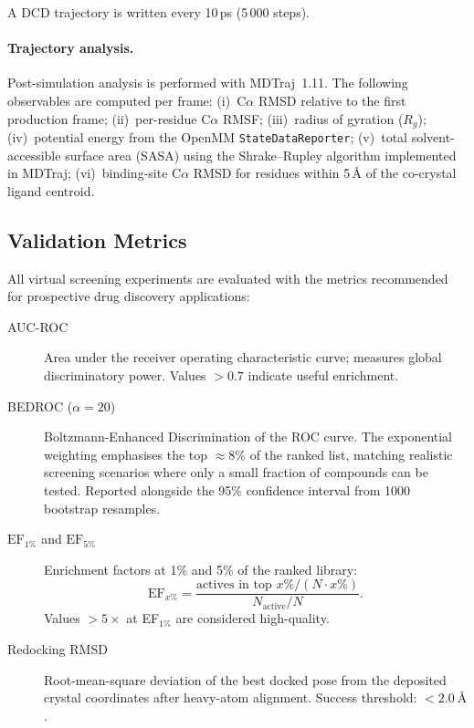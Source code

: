 \documentclass[journal=jcisd8,manuscript=article]{achemso}
\begin{document}
A DCD trajectory is written every 10\,ps (5\,000 steps).

\paragraph{Trajectory analysis.}
Post-simulation analysis is performed with MDTraj~1.11.\cite{eastman2017openmm}
The following observables are computed per frame: (i)~C$\alpha$ RMSD relative
to the first production frame; (ii)~per-residue C$\alpha$ RMSF;
(iii)~radius of gyration ($R_g$); (iv)~potential energy from the
OpenMM \texttt{StateDataReporter}; (v)~total solvent-accessible surface area
(SASA) using the Shrake--Rupley algorithm\cite{shrake1973environment}
implemented in MDTraj; (vi)~binding-site C$\alpha$ RMSD for residues within
5\,\AA{} of the co-crystal ligand centroid.

\subsection{Validation Metrics}

All virtual screening experiments are evaluated with the metrics
recommended for prospective drug discovery applications:\cite{truchon2007evaluating}

\begin{description}
  \item[AUC-ROC] Area under the receiver operating characteristic curve;
        measures global discriminatory power.  Values $> 0.7$ indicate
        useful enrichment.

  \item[BEDROC ($\alpha = 20$)] Boltzmann-Enhanced Discrimination of the ROC
        curve.\cite{truchon2007evaluating}  The exponential weighting
        emphasises the top $\approx 8$\% of the ranked list, matching
        realistic screening scenarios where only a small fraction of
        compounds can be tested.  Reported alongside the 95\% confidence
        interval from 1000 bootstrap resamples.

  \item[$\mathrm{EF}_{1\%}$ and $\mathrm{EF}_{5\%}$] Enrichment factors at
        1\% and 5\% of the ranked library:
        \begin{equation}
          \mathrm{EF}_{x\%} = \frac{
            \text{actives in top } x\% / (N \cdot x\%)
          }{
            N_{\mathrm{active}} / N
          }.
        \end{equation}
        Values $> 5\times$ at EF$_{1\%}$ are considered high-quality.

  \item[Redocking RMSD] Root-mean-square deviation of the best docked pose
        from the deposited crystal coordinates after heavy-atom alignment.
        Success threshold: $< \SI{2.0}{\angstrom}$.
\end{description}
\end{document}
